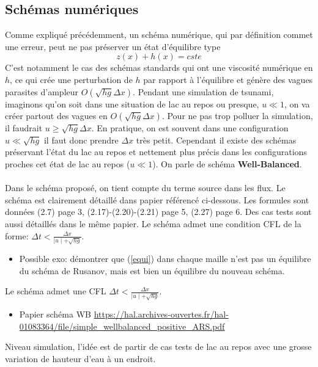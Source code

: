 \documentclass[11pt]{article}
\theoremstyle{definition}
\begin{document}
\subsection{Schémas numériques}
Comme expliqué précédemment, un schéma numérique, qui par définition commet une erreur, peut ne pas préserver un état d'équilibre type
$$
 z(x)+h(x)=cste
$$
C'est notamment le cas des schémas standards qui ont une viscosité numérique en $h$, ce qui crée une perturbation de $h$ par rapport à l'équilibre et génère des vagues parasites d'ampleur $O(\sqrt{hg}\Delta x)$.
Pendant une simulation de tsunami, imaginons qu'on soit dans une situation de lac au repos ou presque, $u \ll 1$, on va créer partout des vagues en $O(\sqrt{hg}\Delta x)$. Pour ne pas trop polluer la simulation, il faudrait $u\geq \sqrt{hg}\Delta x$. En pratique, on est souvent dans une configuration $u \ll \sqrt{hg}$  il faut donc prendre $\Delta x$ très petit. Cependant il existe des schémas préservant l'état du lac au repos et nettement plus précis dans les configurations proches cet état de lac au repos ($u \ll 1$). On parle de schéma \textbf{Well-Balanced}. \\\\
Dans le schéma proposé, on tient compte du terme source dans les flux. Le schéma est clairement détaillé dans papier référencé ci-dessous.
 Les formules sont données (2.7) page 3, (2.17)-(2.20)-(2.21) page 5, (2.27) page 6. Des cas tests sont aussi détaillés dans le même papier.
Le schéma admet une condition CFL de la forme: $\Delta t < \frac{\Delta x}{\mid u \mid +\sqrt{hg}}$. 

\begin{itemize}
\item Possible exo: démontrer que (\ref{equi}) dans chaque maille n'est pas un équilibre du schéma de Rusanov, mais est bien un équilibre du nouveau schéma.
\end{itemize}
Le schéma admet une CFL $\Delta t < \frac{\Delta x}{\mid u \mid +\sqrt{hg}}$. 

\begin{itemize}
\item Papier schéma WB \url{https://hal.archives-ouvertes.fr/hal-01083364/file/simple_wellbalanced_positive_ARS.pdf}
\end{itemize}
Niveau simulation, l'idée est de partir de cas tests de lac au repos avec une grosse variation de hauteur d'eau à un endroit.
\end{document}
